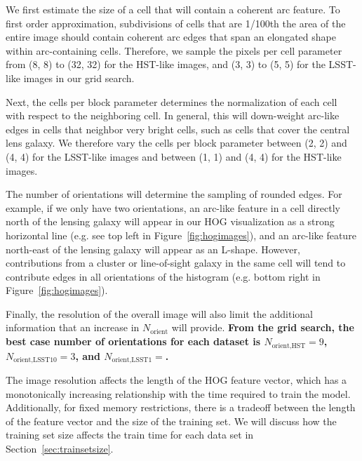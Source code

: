 \documentclass{emulateapj}
\newcommand{\todo}[1]{{\bf\color{blue} #1}}
\begin{document}
We first estimate the size of a cell that will contain a coherent arc
feature.  To first order approximation, subdivisions of cells that are
1/100th the area of the entire image should contain coherent arc edges
that span an elongated shape within arc-containing cells.  Therefore,
we sample the pixels per cell parameter from (8, 8) to (32, 32) for
the HST-like images, and (3, 3) to (5, 5) for the LSST-like images in
our grid search.

Next, the cells per block parameter determines the normalization of
each cell with respect to the neighboring cell.  In general, this will
down-weight arc-like edges in cells that neighbor very bright cells,
such as cells that cover the central lens galaxy.  We therefore vary
the cells per block parameter between (2, 2) and (4, 4) for the
LSST-like images and between (1, 1) and (4, 4) for the HST-like
images.

The number of orientations will determine the sampling of rounded
edges.  For example, if we only have two orientations, an arc-like
feature in a cell directly north of the lensing galaxy will appear in
our HOG visualization as a strong horizontal line (e.g. see top left
in Figure~\ref{fig:hogimages}), and an arc-like feature north-east of
the lensing galaxy will appear as an L-shape.  However, contributions
from a cluster or line-of-sight galaxy in the same cell will tend to
contribute edges in all orientations of the histogram (e.g. bottom
right in Figure~\ref{fig:hogimages}).  

Finally, the resolution of the overall image will also limit the
additional information that an increase in $N_\text{orient}$ will
provide.  \todo{From the grid search, the best case number of orientations
for each dataset is
$N_\text{orient,HST}=9$, $N_\text{orient,LSST10}=3$, and
  $N_\text{orient,LSST1}=$.}

The image resolution affects the length of the HOG feature vector,
which has a monotonically increasing relationship with the time
required to train the model.  Additionally, for fixed memory
restrictions, there is a tradeoff between the length of the feature
vector and the size of the training set.  We will discuss how the
training set size affects the train time for each data set in
Section~\ref{sec:trainsetsize}.
\end{document}
